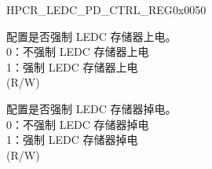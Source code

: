 \begin{register}{H}{PCR\_LEDC\_PD\_CTRL\_REG}{0x0050}\label{regdesc:PCRLEDCPDCTRLREG}
%
%
%
%
\regnewline%
\begin{regdesc}\begin{reglist}
\label{fielddesc:PCRLEDCMEMFORCEPU}\item [PCR\_LEDC\_MEM\_FORCE\_PU] 配置是否强制 LEDC 存储器上电。\\
0：不强制 LEDC 存储器上电 \\
1：强制 LEDC 存储器上电 \\  (R/W)
\label{fielddesc:PCRLEDCMEMFORCEPD}\item [PCR\_LEDC\_MEM\_FORCE\_PD] 配置是否强制 LEDC 存储器掉电。\\
0：不强制 LEDC 存储器掉电\\
1：强制 LEDC 存储器掉电\\(R/W)
\end{reglist}\end{regdesc}
\end{register}


